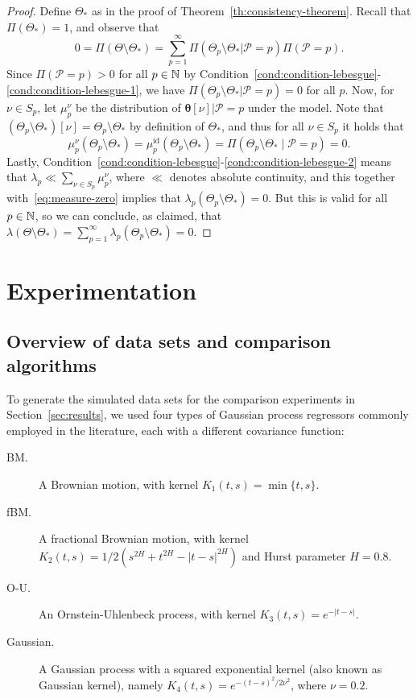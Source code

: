 \begin{proof}
  Define \(\Theta_*\) as in the proof of Theorem~\ref{th:consistency-theorem}. Recall that \(\Pi(\Theta_*)=1\), and observe that 
  \[
  0=\Pi(\Theta \setminus \Theta_*) = \sum_{p=1}^\infty \Pi(\Theta_p \setminus \Theta_*|\mathcal P = p)\Pi(\mathcal P = p).
  \]
Since \(\Pi(\mathcal P = p)> 0\) for all \(p\in\mathbb{N}\) by Condition~\ref{cond:condition-lebesgue}-\ref{cond:condition-lebesgue-1}, we have \(\Pi(\Theta_p\setminus \Theta_*|\mathcal P = p) = 0\) for all \(p\). Now, for \(\nu \in S_p\), let \(\mu^\nu_p\) be the distribution of \(\bm\theta[\nu]|\mathcal P=p\) under the model. Note that \((\Theta_p\setminus \Theta_*)[\nu] = \Theta_p \setminus \Theta_*\) by definition of \(\Theta_*\), and thus for all \(\nu\in S_p\) it holds that
\begin{equation}\label{eq:measure-zero}
  \mu^\nu_p (\Theta_p \setminus \Theta_*) = \mu_p^{\text{id}} (\Theta_p \setminus \Theta_*) = \Pi (\Theta_p \setminus \Theta_*\mid\mathcal P = p) =0.
\end{equation}
Lastly, Condition~\ref{cond:condition-lebesgue}-\ref{cond:condition-lebesgue-2} means that \(\lambda_p \ll \sum_{\nu\in S_p}\mu^\nu_p\), where \(\ll\) denotes absolute continuity, and this together with~\eqref{eq:measure-zero} implies that \(\lambda_p(\Theta_p \setminus \Theta_*)=0\). But this is valid for all \(p\in\mathbb{N}\), so we can conclude, as claimed, that \(\lambda(\Theta\setminus \Theta_*) = \sum_{p=1}^\infty \lambda_p(\Theta_p\setminus \Theta_*)=0\).
\end{proof}


\newpage
\section{Experimentation}\label{app:experiments}

\subsection{Overview of data sets and comparison algorithms}\label{app:data-sets}

To generate the simulated data sets for the comparison experiments in Section~\ref{sec:results}, we used four types of Gaussian process regressors commonly employed in the literature, each with a different covariance function:
\begin{description}
  \item [BM.] A Brownian motion, with kernel \(K_1(t,s)=\min\{t,s\}\).
  \item [fBM.] A fractional Brownian motion, with kernel \(K_2(t,s)=1/2(s^{2H} + t^{2H} - |t-s|^{2H})\) and Hurst parameter \(H=0.8\).
  \item [O-U.] An Ornstein-Uhlenbeck process, with kernel \(K_3(t,s)=e^{-|t-s|}\).
  \item [Gaussian.] A Gaussian process with a squared exponential kernel (also known as Gaussian kernel), namely \(K_4(t,s)=e^{-(t-s)^2/2\nu^2}\), where \(\nu=0.2\).
\end{description}

